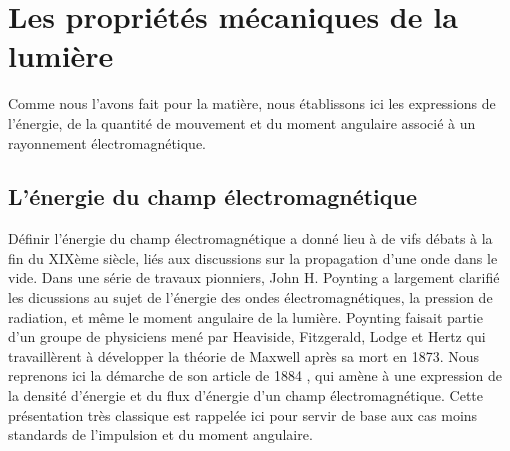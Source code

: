 \section{Les propriétés mécaniques de la lumière}
Comme nous l'avons fait pour la matière, nous établissons ici les expressions de l'énergie, de la quantité de mouvement et du moment angulaire associé à un rayonnement électromagnétique.

\subsection{L'énergie du champ électromagnétique} 
Définir l'énergie du champ électromagnétique a donné lieu à de vifs débats à la fin du XIXème siècle, liés aux discussions sur la propagation d'une onde dans le vide. Dans une série de travaux pionniers, John H. Poynting a largement clarifié les dicussions au sujet de l'énergie des ondes électromagnétiques, la pression de radiation, et même le moment angulaire de la lumière. Poynting faisait partie d'un groupe de physiciens mené par Heaviside, Fitzgerald, Lodge et Hertz qui travaillèrent à développer la théorie de Maxwell après sa mort en 1873. Nous reprenons ici la démarche de son article de 1884 , qui amène à une expression de la densité d'énergie et du flux d'énergie d'un champ électromagnétique. Cette présentation très classique est rappelée ici pour servir de base aux cas moins standards de l'impulsion et du moment angulaire.

